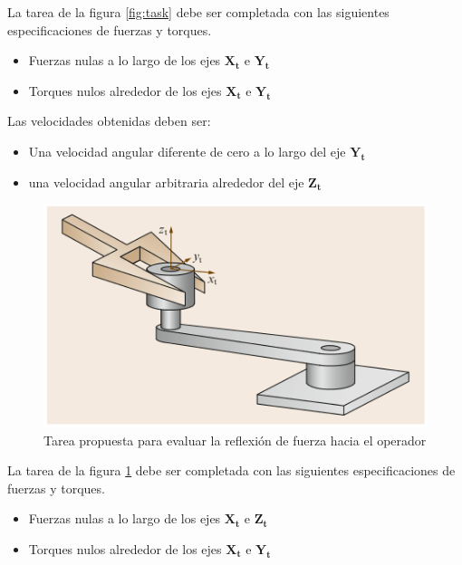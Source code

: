 La tarea de la figura \ref{fig:task} debe ser completada con las siguientes especificaciones de fuerzas y torques. 

\begin{itemize}

\item Fuerzas nulas a lo largo de los ejes $\mathbf{X_t}$ e $\mathbf{Y_t}$

\item Torques nulos alrededor de los ejes $\mathbf{X_t}$ e $\mathbf{Y_t}$

\end{itemize}


Las velocidades obtenidas deben ser:

\begin{itemize}
\item Una velocidad angular diferente de cero a lo largo del eje $\mathbf{Y_t}$

\item una velocidad angular arbitraria alrededor del eje $\mathbf{Z_t}$

\end{itemize}




\begin{figure}
\centering
\label{fig:task2}
\includegraphics[scale=0.5]{FiguresP/task2}
\caption{Tarea propuesta para evaluar la reflexión de fuerza hacia el operador}
\end{figure}


La tarea de la figura \ref{fig:task2} debe ser completada con las siguientes especificaciones de fuerzas y torques. 


\begin{itemize}

\item Fuerzas nulas a lo largo de los ejes $\mathbf{X_t}$ e $\mathbf{Z_t}$

\item Torques nulos alrededor de los ejes $\mathbf{X_t}$ e $\mathbf{Y_t}$

\end{itemize}


